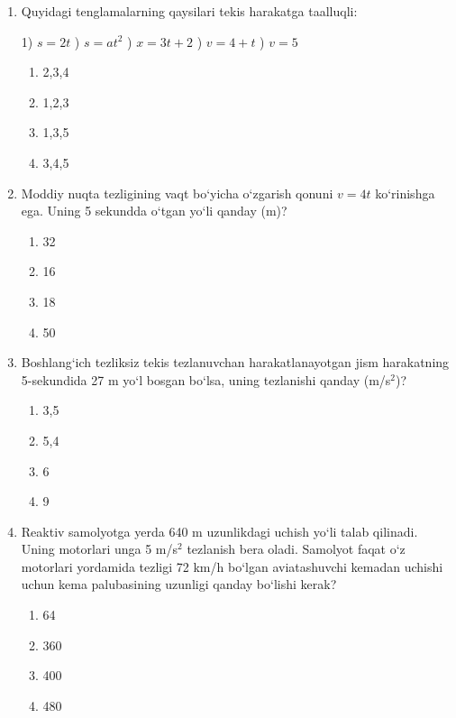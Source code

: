 \begin{enumerate}
\begin{enumerate}[label=\Alph*)]
\item 1,5
\item 4,5
\item 3
\item 6
\end{enumerate}

\item Quyidagi tenglamalarning qaysilari tekis harakatga taalluqli:

1) $s=2t$ ) $s=at^2$ ) $x=3t+2$ ) $v=4+t$ ) $v=5$

\begin{enumerate}[label=\Alph*)]
\item 2,3,4
\item 1,2,3
\item 1,3,5
\item 3,4,5
\end{enumerate}

\item Moddiy nuqta tezligining vaqt bo‘yicha o‘zgarish qonuni
$v=4t$ ko‘rinishga ega. Uning 5 sekundda o‘tgan yo‘li qanday (m)?

\begin{enumerate}[label=\Alph*)]
\item 32
\item 16
\item 18
\item 50
\end{enumerate}

\item Boshlang‘ich tezliksiz tekis tezlanuvchan harakatlanayotgan jism 
harakatning 5-sekundida 27 m yo‘l bosgan bo‘lsa, uning tezlanishi qanday (m/s$^2$)?

\begin{enumerate}[label=\Alph*)]
\item 3,5
\item 5,4
\item 6
\item 9
\end{enumerate}


\item Reaktiv samolyotga yerda 640 m uzunlikdagi uchish yo‘li talab qilinadi. 
Uning motorlari unga 5 m/s$^2$ tezlanish bera oladi. Samolyot faqat o‘z 
motorlari yordamida tezligi 72 km/h bo‘lgan aviatashuvchi kemadan 
uchishi uchun kema palubasining uzunligi qanday bo‘lishi kerak?

\begin{enumerate}[label=\Alph*)]
\item 64
\item 360
\item 400
\item 480
\end{enumerate}



\end{enumerate}
